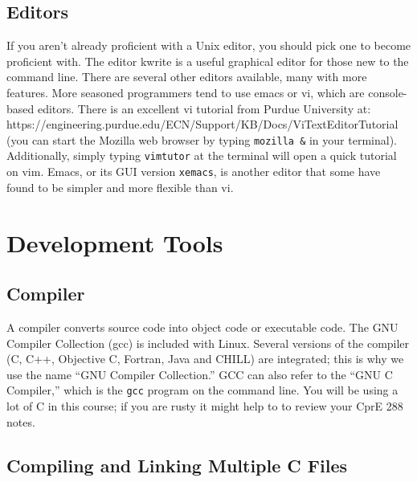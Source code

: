 \documentclass[letterpaper,10pt]{article}
\newcommand{\cmd}[1]{\texttt{#1}}
\begin{document}
\subsection{Editors}
If you aren't already proficient with a Unix editor, you should pick one to become proficient with. The editor kwrite is a useful graphical editor for those new to the command line. There are several other editors available, many with more features.
More seasoned programmers tend to use emacs or vi, which are console-based editors. There is an excellent vi tutorial from Purdue University at: https://engineering.purdue.edu/ECN/Support/KB/Docs/ViTextEditorTutorial (you can start the Mozilla web browser by typing \cmd{mozilla \&} in your terminal).  Additionally, simply typing \cmd{vimtutor} at the terminal will open a quick tutorial on vim.  Emacs, or its GUI version \texttt{xemacs}, is another editor that some have found to be simpler and more flexible than vi.

\section{Development Tools}
\subsection{Compiler}
A compiler converts source code into object code or executable code. The GNU Compiler Collection (gcc) is included with Linux. Several versions of the compiler (C, C++, Objective C, Fortran, Java and CHILL) are integrated; this is why we use the name ``GNU Compiler Collection.'' GCC can also refer to the ``GNU C Compiler,'' which is the \cmd{gcc} program on the command line. You will be using a lot of C in this course; if you are rusty it might help to to review your CprE 288 notes.

\subsection{Compiling and Linking Multiple C Files}
\end{document}
